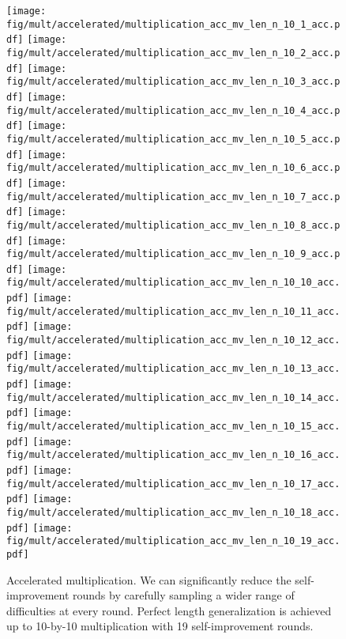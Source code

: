 \begin{figure}
    \centering
    \texttt{[image: fig/mult/accelerated/multiplication\_acc\_mv\_len\_n\_10\_1\_acc.pdf]}
    \texttt{[image: fig/mult/accelerated/multiplication\_acc\_mv\_len\_n\_10\_2\_acc.pdf]}
    \texttt{[image: fig/mult/accelerated/multiplication\_acc\_mv\_len\_n\_10\_3\_acc.pdf]}
    \texttt{[image: fig/mult/accelerated/multiplication\_acc\_mv\_len\_n\_10\_4\_acc.pdf]}
    \texttt{[image: fig/mult/accelerated/multiplication\_acc\_mv\_len\_n\_10\_5\_acc.pdf]}
    \texttt{[image: fig/mult/accelerated/multiplication\_acc\_mv\_len\_n\_10\_6\_acc.pdf]}
    \texttt{[image: fig/mult/accelerated/multiplication\_acc\_mv\_len\_n\_10\_7\_acc.pdf]}
    \texttt{[image: fig/mult/accelerated/multiplication\_acc\_mv\_len\_n\_10\_8\_acc.pdf]}
    \texttt{[image: fig/mult/accelerated/multiplication\_acc\_mv\_len\_n\_10\_9\_acc.pdf]}
    \texttt{[image: fig/mult/accelerated/multiplication\_acc\_mv\_len\_n\_10\_10\_acc.pdf]}
    \texttt{[image: fig/mult/accelerated/multiplication\_acc\_mv\_len\_n\_10\_11\_acc.pdf]}
    \texttt{[image: fig/mult/accelerated/multiplication\_acc\_mv\_len\_n\_10\_12\_acc.pdf]}
    \texttt{[image: fig/mult/accelerated/multiplication\_acc\_mv\_len\_n\_10\_13\_acc.pdf]}
    \texttt{[image: fig/mult/accelerated/multiplication\_acc\_mv\_len\_n\_10\_14\_acc.pdf]}
    \texttt{[image: fig/mult/accelerated/multiplication\_acc\_mv\_len\_n\_10\_15\_acc.pdf]}
    \texttt{[image: fig/mult/accelerated/multiplication\_acc\_mv\_len\_n\_10\_16\_acc.pdf]}
    \texttt{[image: fig/mult/accelerated/multiplication\_acc\_mv\_len\_n\_10\_17\_acc.pdf]}
    \texttt{[image: fig/mult/accelerated/multiplication\_acc\_mv\_len\_n\_10\_18\_acc.pdf]}
    \texttt{[image: fig/mult/accelerated/multiplication\_acc\_mv\_len\_n\_10\_19\_acc.pdf]}

    \caption{Accelerated multiplication. We can significantly reduce the self-improvement rounds by carefully sampling a wider range of difficulties at every round. Perfect length generalization is achieved up to 10-by-10 multiplication with 19 self-improvement rounds. }
    \label{fig:multiplication_accelerated_len_n10_full}
\end{figure}




